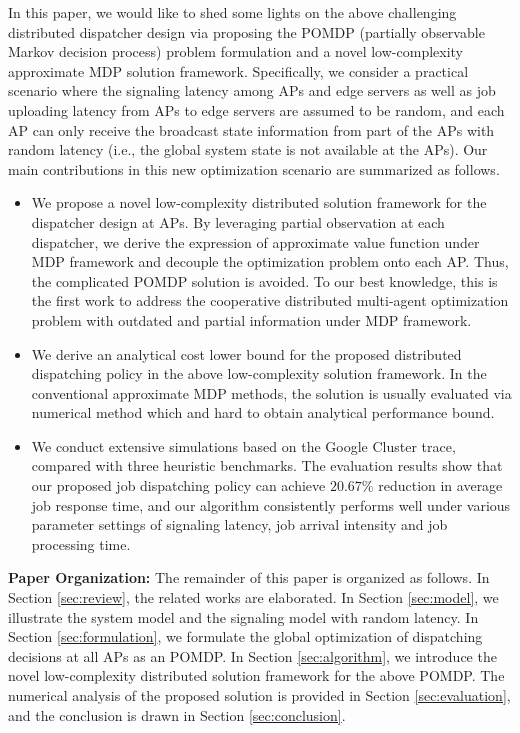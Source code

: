 In this paper, we would like to shed some lights on the above challenging distributed dispatcher design via proposing the POMDP (partially observable Markov decision process) problem formulation and a novel low-complexity approximate MDP solution framework.
Specifically, we consider a practical scenario where the signaling latency among APs and edge servers as well as job uploading latency from APs to edge servers are assumed to be random, and each AP can only receive the broadcast state information from part of the APs with random latency (i.e., the global system state is not available at the APs).
Our main contributions in this new optimization scenario are summarized as follows.
\begin{itemize}
    \item %
    We propose a novel low-complexity distributed solution framework for the dispatcher design at APs.
    By leveraging partial observation at each dispatcher, we derive the expression of approximate value function under MDP framework and decouple the optimization problem onto each AP.
    Thus, the complicated POMDP solution is avoided.
    To our best knowledge, this is the first work to address the cooperative distributed multi-agent optimization problem with outdated and partial information under MDP framework.
    \item %
    We derive an analytical cost lower bound for the proposed distributed dispatching policy in the above low-complexity solution framework.
    In the conventional approximate MDP methods, the solution is usually evaluated via numerical method which and hard to obtain analytical performance bound.
    \item We conduct extensive simulations based on the Google Cluster trace, compared with three heuristic benchmarks. The evaluation results show that our proposed job dispatching policy can achieve $20.67\%$ reduction in average job response time, and our algorithm consistently performs well under various parameter settings of signaling latency, job arrival intensity and job processing time.
\end{itemize}

\noindent \textbf{Paper Organization: }The remainder of this paper is organized as follows.
In Section \ref{sec:review}, the related works are elaborated.
In Section \ref{sec:model}, we illustrate the system model and the signaling model with random latency.
In Section \ref{sec:formulation}, we formulate the global optimization of dispatching decisions at all APs as an POMDP.
In Section \ref{sec:algorithm}, we introduce the novel low-complexity distributed solution framework for the above POMDP.
The numerical analysis of the proposed solution is provided in Section \ref{sec:evaluation}, and the conclusion is drawn in Section \ref{sec:conclusion}.

